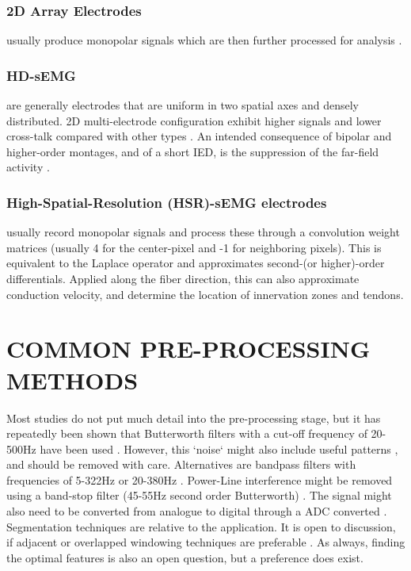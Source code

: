 \documentclass{article}
\begin{document}
\subsubsection{2D Array Electrodes} usually produce monopolar signals which are then further processed for analysis \cite{Kilby2016}. 
\subsubsection{HD-sEMG} are generally electrodes that are uniform in two spatial axes and densely distributed. 2D multi-electrode configuration exhibit higher signals and lower cross-talk compared with other types \cite{Dimitrov2003a}. An intended consequence of bipolar and higher-order montages, and of a short IED, is the suppression of the far-field activity \cite{Kilby2016}.
\subsubsection{High-Spatial-Resolution (HSR)-sEMG electrodes} usually record monopolar signals and process these through a convolution weight matrices (usually 4 for the center-pixel  and -1 for neighboring pixels). This is equivalent to the Laplace operator and approximates second-(or higher)-order differentials. Applied along the fiber direction, this can also approximate conduction velocity, and determine the location of innervation zones and tendons.

\section{COMMON PRE-PROCESSING METHODS}
Most studies do not put much detail into the pre-processing stage, but it has repeatedly been shown that Butterworth filters with a cut-off frequency of 20-500Hz have been used \cite{Boxtel2001} \cite{Kim2016}. However, this `noise` might also include useful patterns \cite{Geng2016}, and should be removed with care. Alternatives are bandpass filters with frequencies of 5-322Hz \cite{Sulaiman2016} or 20-380Hz \cite{Du2017}. Power-Line interference might be removed using a band-stop filter (45-55Hz second order Butterworth) \cite{Du2017}. The signal might also need to be converted from analogue to digital through a ADC converted \cite{Sulaiman2016}.  Segmentation techniques are relative to the application. It is open to discussion, if adjacent or overlapped windowing techniques are preferable \cite{Nazmi2016}. As always, finding the optimal features is also an open question, but a preference does exist.
\end{document}

